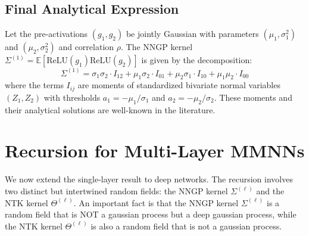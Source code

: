 \documentclass[a4paper]{article}
\begin{document}
\subsection{Final Analytical Expression}
\begin{theorem}
Let the pre-activations $(g_1, g_2)$ be jointly Gaussian with parameters $(\mu_1, \sigma_1^2)$ and $(\mu_2, \sigma_2^2)$ and correlation $\rho$. The NNGP kernel $\Sigma^{(1)} = \mathbb{E}[\text{ReLU}(g_1)\text{ReLU}(g_2)]$ is given by the decomposition:
\begin{equation}
\label{eq:final_ntk_decomp}
\boxed{
\Sigma^{(1)} = \sigma_1\sigma_2 \cdot I_{12} + \mu_1\sigma_2 \cdot I_{01} + \mu_2\sigma_1 \cdot I_{10} + \mu_1\mu_2 \cdot I_{00}
}
\end{equation}
where the terms $I_{ij}$ are moments of standardized bivariate normal variables $(Z_1, Z_2)$ with thresholds $a_1 = -\mu_1/\sigma_1$ and $a_2 = -\mu_2/\sigma_2$. These moments and their analytical solutions are well-known in the literature.
\end{theorem}







\section{Recursion for Multi-Layer MMNNs}
We now extend the single-layer result to deep networks. The recursion involves two distinct but intertwined random fields: the NNGP kernel $\Sigma^{(\ell)}$ and the NTK kernel $\Theta^{(\ell)}$.
An important fact is that the NNGP kernel $\Sigma^{(\ell)}$ is a random field that is NOT a gaussian process but a deep gaussian process, while the NTK kernel $\Theta^{(\ell)}$ is also a random field that is not a gaussian process.
\end{document}
